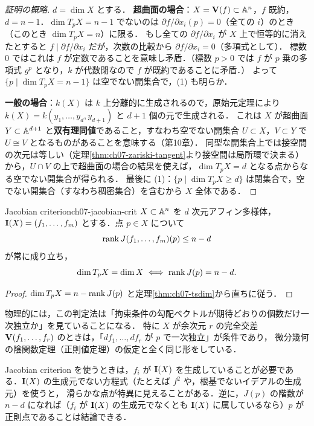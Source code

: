 \begin{proof}[証明の概略]
$d=\dim X$ とする．
\textbf{超曲面の場合}：$X=\mathbf{V}(f)\subset\mathbb{A}^n$，$f$ 既約，$d=n-1$．$\dim T_pX=n-1$ でないのは $\partial f/\partial x_i(p)=0$（全ての $i$）のとき（このとき $\dim T_pX=n$）に限る．
もし全ての $\partial f/\partial x_i$ が $X$ 上で恒等的に消えたとすると $f\mid\partial f/\partial x_i$ だが，次数の比較から $\partial f/\partial x_i=0$（多項式として）．
標数 $0$ ではこれは $f$ が定数であることを意味し矛盾．（標数 $p>0$ では $f$ が $p$ 乗の多項式 $g^p$ となり，$k$ が代数閉なので $f$ が既約であることに矛盾．）
よって $\{p\mid\dim T_pX=n-1\}$ は空でない開集合で，(1) も明らか．

\textbf{一般の場合}：$k(X)$ は $k$ 上分離的に生成されるので，原始元定理により $k(X)=k(y_1,\dots,y_d,y_{d+1})$ と $d+1$ 個の元で生成される．
これは $X$ が超曲面 $Y\subset\mathbb{A}^{d+1}$ と\textbf{双有理同値}であること，すなわち空でない開集合 $U\subset X$，$V\subset Y$ で $U\cong V$ となるものがあることを意味する（第10章）．
同型な開集合上では接空間の次元は等しい（定理\ref{thm:ch07-zariski-tangent}より接空間は局所環で決まる）から，$U\cap V$ の上で超曲面の場合の結果を使えば，$\dim T_pX=d$ となる点からなる空でない開集合が得られる．
最後に (1)：$\{p\mid\dim T_pX\ge d\}$ は閉集合で，空でない開集合（すなわち稠密集合）を含むから $X$ 全体である．
\end{proof}

\begin{mythm}{Jacobian criterion}{ch07-jacobian-crit}
$X\subset\mathbb{A}^n$ を $d$ 次元アフィン多様体，$\mathbf{I}(X)=(f_1,\dots,f_m)$ とする．点 $p\in X$ について
\[
  \operatorname{rank} J(f_1,\dots,f_m)(p)\le n-d
\]
が常に成り立ち，
\[
  \dim T_pX=\dim X\iff\operatorname{rank} J(p)=n-d.
\]
\end{mythm}

\begin{proof}
$\dim T_pX=n-\operatorname{rank} J(p)$ と定理\ref{thm:ch07-tsdim}から直ちに従う．
\end{proof}

物理的には，この判定法は「拘束条件の勾配ベクトルが期待どおりの個数だけ一次独立か」を見ていることになる．
特に $X$ が余次元 $r$ の完全交差 $\mathbf{V}(f_1,\dots,f_r)$ のときは，「$df_1,\dots,df_r$ が $p$ で一次独立」が条件であり，
微分幾何の陰関数定理（正則値定理）の仮定と全く同じ形をしている．

\begin{note}
Jacobian criterion を使うときは，$f_i$ が $\mathbf{I}(X)$ を生成していることが必要である．$\mathbf{I}(X)$ の生成元でない方程式（たとえば $f^2$ や，根基でないイデアルの生成元）を使うと，
滑らかな点が特異に見えることがある．逆に，$J(p)$ の階数が $n-d$ になれば（$f_i$ が $\mathbf{I}(X)$ の生成元でなくとも $\mathbf{I}(X)$ に属しているなら）$p$ が正則点であることは結論できる．
\end{note}

